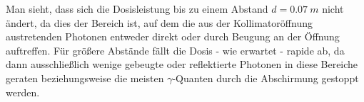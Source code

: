     \minipanf    
        \label{fig:Aufweitung}
    \minipend
    \vspace{5mm}

Man sieht, dass sich die Dosisleistung bis zu einem Abstand $d=0.07\ m$ nicht ändert, da dies der Bereich ist, auf dem die aus der Kollimatoröffnung austretenden Photonen entweder direkt oder durch Beugung an der Öffnung auftreffen. Für größere Abstände fällt die Dosis - wie erwartet - rapide ab, da dann ausschließlich wenige gebeugte oder reflektierte Photonen in diese Bereiche geraten beziehungsweise die meisten $\gamma$-Quanten durch die Abschirmung gestoppt werden.

